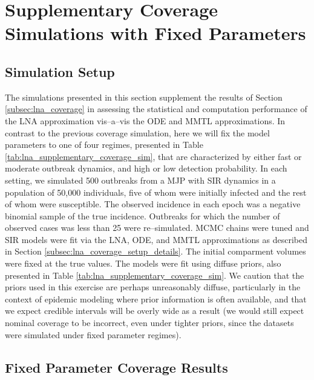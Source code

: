 \newpage

\section{Supplementary Coverage Simulations with Fixed Parameters}
\label{sec:lna_fixedpar_coverage}

\subsection{Simulation Setup}
\label{subsec:lna_fixedpar_setup}

The simulations presented in this section supplement the results of Section \ref{subsec:lna_coverage} in assessing the statistical and computation performance of the LNA approximation vis--a--vis the ODE and MMTL approximations. In contrast to the previous coverage simulation, here we will fix the model parameters to one of four regimes, presented in Table \ref{tab:lna_supplementary_coverage_sim}, that are characterized by either fast or moderate outbreak dynamics, and high or low detection probability. In each setting, we simulated 500 outbreaks from a MJP with SIR dynamics in a population of 50,000 individuals, five of whom were initially infected and the rest of whom were susceptible. The observed incidence in each epoch was a negative binomial sample of the true incidence. Outbreaks for which the number of observed cases was less than 25 were re--simulated. MCMC chains were tuned and SIR models were fit via the LNA, ODE, and MMTL approximations as described in Section \ref{subsec:lna_coverage_setup_details}. The initial comparment volumes were fixed at the true values. The models were fit using diffuse priors, also presented in Table \ref{tab:lna_supplementary_coverage_sim}. We caution that the priors used in this exercise are perhaps unreasonably diffuse, particularly in the context of epidemic modeling where prior information is often available, and that we expect credible intervals will be overly wide as a result (we would still expect nominal coverage to be incorrect, even under tighter priors, since the datasets were simulated under fixed parameter regimes).

\newpage

\subsection{Fixed Parameter Coverage Results}
\label{subsec:lna_fixedpar_sim_results}

